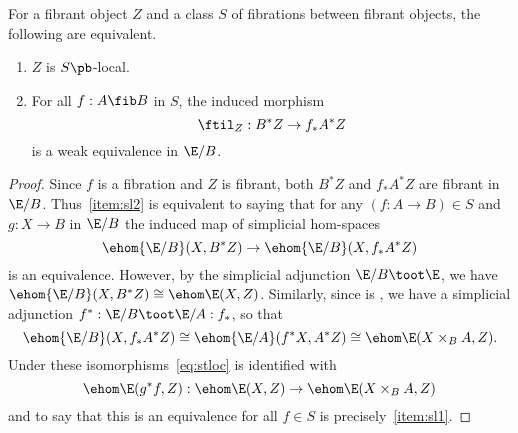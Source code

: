 \begin{lem}\label{thm:stloc}
  For a fibrant object $Z$ and a class $S$ of fibrations between fibrant objects, the following are equivalent.
  \begin{enumerate}
  \item $Z$ is $S\pb$-local.\label{item:sl1}
  \item For all $f:A\fib B$ in $S$, the induced morphism
    \begin{equation}
      \ftil_Z : B^* Z \to f_* A^* Z\label{eq:stloc}
    \end{equation}
    is a weak equivalence in $\E/B$.\label{item:sl2}
  \end{enumerate}
\end{lem}
\begin{proof}
  Since $f$ is a fibration and $Z$ is fibrant, both $B^*Z$ and $f_* A^* Z$ are fibrant in $\E/B$.
  Thus~\ref{item:sl2} is equivalent to saying that for any $(f:A\to B)\in S$ and $g:X\to B$ in $\E/B$ the induced map of simplicial hom-spaces
  \[ \ehom{\E/B}(X,B^*Z) \to \ehom{\E/B}(X,f_* A^* Z) \]
  is an equivalence.
  However, by the simplicial adjunction $\E/B \toot \E$, we have $\ehom{\E/B}(X,B^*Z) \cong \ehom\E(X,Z)$.
  Similarly, since \E is \slcc, we have a simplicial adjunction $f^* : \E/B \toot \E/A : f_*$, so that
  \[\ehom{\E/B}(X,f_* A^* Z) \cong \ehom{\E/A}(f^*X, A^* Z) \cong \ehom\E(X\times_B A, Z). \]
  Under these isomorphisms~\eqref{eq:stloc} is identified with
  \[ \ehom\E(g^*f,Z) : \ehom\E(X,Z) \to \ehom\E(X\times_B A,Z) \]
  and to say that this is an equivalence for all $f\in S$ is precisely~\ref{item:sl1}.
\end{proof}

